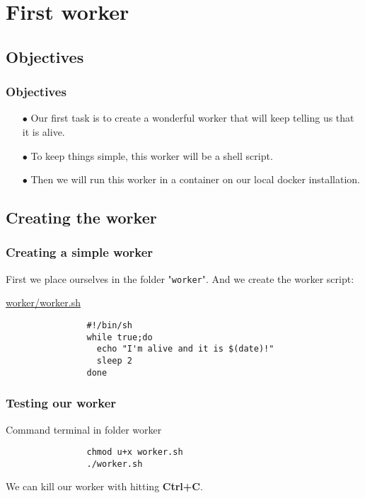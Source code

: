 \section{First worker}

\subsection{Objectives}	
	\begin{frame}
		\frametitle{Objectives}
		
		\begin{itemize}
			\item[$\bullet$] Our first task is to create a wonderful worker that will keep telling us that it is alive.
			\item[$\bullet$] To keep things simple, this worker will be a shell script.	
			\item[$\bullet$] Then we will run this worker in a container on our local docker installation.
		\end{itemize}
		
	\end{frame}

\subsection{Creating the worker}
	
	\begin{frame}[fragile]
		\frametitle{Creating a simple worker}

		First we place ourselves in the folder "\verb!worker!". And we create the worker script:
		
		\begin{block}{\href{https://github.com/Tinkou/trainings/blob/master/trainings/sources/dev-onboarding/files/worker/worker.sh}{worker/worker.sh}}
			\begin{verbatim}
				#!/bin/sh
				while true;do
				  echo "I'm alive and it is $(date)!"
				  sleep 2
				done
			\end{verbatim}
		\end{block}
		
	\end{frame}

	\begin{frame}[fragile]
		\frametitle{Testing our worker}
		
		\begin{block}{Command terminal in folder worker}
			\begin{verbatim}
				chmod u+x worker.sh
				./worker.sh
			\end{verbatim}
		\end{block}
		We can kill our worker with hitting \textbf{Ctrl+C}.
		
	\end{frame}
	
